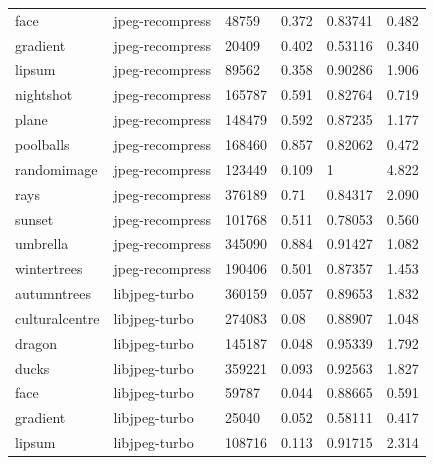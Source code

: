 \documentclass[12pt]{article}
\begin{document}
{\begin{longtable}{llllll}
	face           & jpeg-recompress  & 48759        & 0.372              & 0.83741   & 0.482                \\
	gradient       & jpeg-recompress  & 20409        & 0.402              & 0.53116   & 0.340                \\
	lipsum         & jpeg-recompress  & 89562        & 0.358              & 0.90286   & 1.906                \\
	nightshot      & jpeg-recompress  & 165787       & 0.591              & 0.82764   & 0.719                \\
	plane          & jpeg-recompress  & 148479       & 0.592              & 0.87235   & 1.177                \\
	poolballs      & jpeg-recompress  & 168460       & 0.857              & 0.82062   & 0.472                \\
	randomimage    & jpeg-recompress  & 123449       & 0.109              & 1         & 4.822                \\
	rays           & jpeg-recompress  & 376189       & 0.71               & 0.84317   & 2.090                \\
	sunset         & jpeg-recompress  & 101768       & 0.511              & 0.78053   & 0.560                \\
	umbrella       & jpeg-recompress  & 345090       & 0.884              & 0.91427   & 1.082                \\
	wintertrees    & jpeg-recompress  & 190406       & 0.501              & 0.87357   & 1.453                \\
	autumntrees    & libjpeg-turbo    & 360159       & 0.057              & 0.89653   & 1.832                \\
	culturalcentre & libjpeg-turbo    & 274083       & 0.08               & 0.88907   & 1.048                \\
	dragon         & libjpeg-turbo    & 145187       & 0.048              & 0.95339   & 1.792                \\
	ducks          & libjpeg-turbo    & 359221       & 0.093              & 0.92563   & 1.827                \\
	face           & libjpeg-turbo    & 59787        & 0.044              & 0.88665   & 0.591                \\
	gradient       & libjpeg-turbo    & 25040        & 0.052              & 0.58111   & 0.417                \\
	lipsum         & libjpeg-turbo    & 108716       & 0.113              & 0.91715   & 2.314                \\

\end{longtable}}
\end{document}
